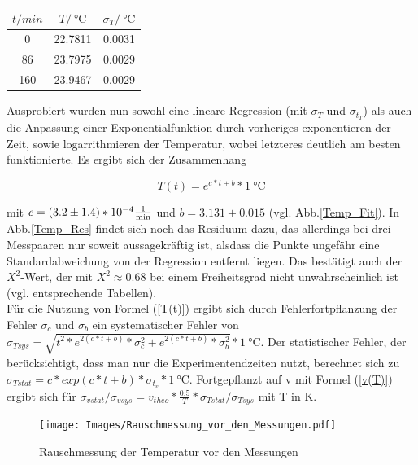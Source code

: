 \documentclass[]{article}
\begin{document}
 	\begin{center}
 	\begin{tabular}{c|c|c}
 		$t/min$ & $T/\SI{}{\celsius}$ & $\sigma_T/\SI{}{\celsius}$\\
 		\hline
 		0 & 22.7811 & 0.0031\\
 		\hline 
 		86 & 23.7975 & 0.0029\\
 		\hline
 		160 & 23.9467 & 0.0029\\
 	\end{tabular}
 	\end{center}
 	
 	Ausprobiert wurden nun sowohl eine lineare Regression (mit $\sigma_T$ und $\sigma_{t_T}$) als auch die Anpassung einer Exponentialfunktion durch vorheriges exponentieren der Zeit, sowie logarrithmieren der Temperatur, wobei letzteres deutlich am besten funktionierte. Es ergibt sich der Zusammenhang
 	
 	\begin{equation}
 	T(t)=e^{c*t+b} *\SI{1}{\celsius}
 	\label{T(t)}
 	\end{equation}
 	
	mit $c=(3.2\pm1.4)*10^{-4}\SI{}{\frac{1}{\minute}}$ und $b=3.131\pm0.015$ (vgl. Abb.\ref{Temp_Fit}).
	In Abb.\ref{Temp_Res} findet sich noch das Residuum dazu, das allerdings bei drei Messpaaren nur soweit aussagekräftig ist, alsdass die Punkte ungefähr eine Standardabweichung von der Regression entfernt liegen. Das bestätigt auch der $X^2$-Wert, der mit $X^2\approx0.68$ bei einem Freiheitsgrad nicht unwahrscheinlich ist (vgl. entsprechende Tabellen).\\
	Für die Nutzung von Formel (\ref{T(t)}) ergibt sich durch Fehlerfortpflanzung der Fehler $\sigma_c$ und $\sigma_b$ ein systematischer Fehler von $\sigma_{Tsys}=\sqrt{t^2*e^{2(c*t+b)}*\sigma_c^2+e^{2(c*t+b)}*\sigma_b^2}*\SI{1}{\celsius}$. Der statistischer Fehler, der berücksichtigt, dass man nur die Experimentendzeiten nutzt, berechnet sich zu $\sigma_{Tstat}=c*exp{(c*t+b)}*\sigma_{t_v}*\SI{1}{\celsius}$. Fortgepflanzt auf v mit Formel (\ref{v(T)}) ergibt sich für $\sigma_{vstat}/\sigma_{vsys}=v_{theo}*\frac{0.5}{T}*\sigma_{Tstat}/\sigma_{Tsys}$ mit T in K.\\
	
	\begin{figure}
	\begin{center}
		\texttt{[image: Images/Rauschmessung\_vor\_den\_Messungen.pdf]}
		\caption{Rauschmessung der Temperatur vor den Messungen}
		\label{Temp_vorn}
	\end{center}
	\end{figure}	
\end{document}
